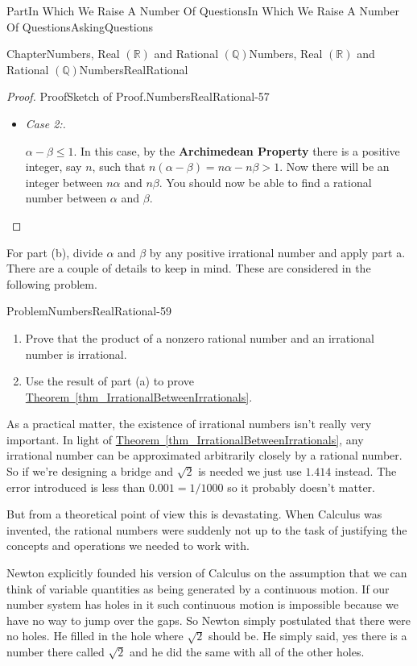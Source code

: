 \documentclass[oneside,10pt,]{book}
\newcommand{\xreffont}{\relax}
\newcommand{\terminology}[1]{\textbf{#1}}
\newcommand{\lititle}[1]{{\slshape#1}}
\numberwithin{equation}{part}
\newcommand{\RR}{\mathbb {R}}
\newcommand{\QQ}{\mathbb {Q}}
\begin{document}
\begin{partptx}{Part}{In Which We Raise A Number Of Questions}{}{In Which We Raise A Number Of Questions}{}{}{AskingQuestions}
\begin{chapterptx}{Chapter}{Numbers, Real \(\left(\RR\right)\) and Rational \(\left(\QQ\right)\)}{}{Numbers, Real \(\left(\RR\right)\) and Rational \(\left(\QQ\right)\)}{}{}{NumbersRealRational}
\begin{proof}{Proof}{Sketch of Proof.}{NumbersRealRational-57}
\begin{itemize}[label=\textbullet]
\item{}\lititle{Case 2:.}\par%
\(\alpha-\beta \le 1\).  In this case, by the \terminology{Archimedean Property} there is a positive integer, say \(n\), such that \(n(\alpha-\beta) = n\alpha-n\beta
> 1\).  Now there will be an integer between \(n\alpha\) and \(n\beta\).  You should now be able to find a rational number between \(\alpha\) and \(\beta\).%
\end{itemize}
%
\end{proof}
For part (b), divide \(\alpha\) and \(\beta\) by any positive irrational number and apply part a.  There are a couple of details to keep in mind.  These are considered in the following problem.%
\begin{problem}{Problem}{}{NumbersRealRational-59}%
\begin{enumerate}[font=\bfseries,label=(\alph*),ref=\alph*]%
\item{}Prove that the product of a nonzero rational number and an irrational number is irrational.%
\item{}Use the result of part (a) to prove \hyperref[thm_IrrationalBetweenIrrationals]{Theorem~{\xreffont\ref{thm_IrrationalBetweenIrrationals}}}.%
\end{enumerate}%
\end{problem}
As a practical matter, the existence of irrational numbers isn't really very important.  In light of \hyperref[thm_IrrationalBetweenIrrationals]{Theorem~{\xreffont\ref{thm_IrrationalBetweenIrrationals}}}, any irrational number can be approximated arbitrarily closely by a rational number.  So if we're designing a bridge and \(\sqrt{2}\) is needed we just use \(1.414\) instead.  The error introduced is less than \(0.001 =1/1000\) so it probably doesn't matter.%
\par
But from a theoretical point of view this is devastating.  When Calculus was invented, the rational numbers were suddenly not up to the task of justifying the concepts and operations we needed to work with.%
\par
{} Newton explicitly founded his version of Calculus on the assumption that we can think of variable quantities as being generated by a continuous motion.  If our number system has holes in it such continuous motion is impossible because we have no way to jump over the gaps.  So Newton simply postulated that there were no holes.  He filled in the hole where \(\sqrt{2}\) should be.  He simply said, yes there is a number there called \(\sqrt{2}\) and he did the same with all of the other holes.%

\end{chapterptx}
\end{partptx}
\end{document}
